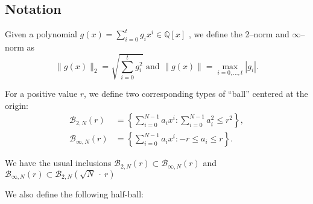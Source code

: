 \documentclass[a4paper, 12pt]{article}
\newcommand{\ndash}{\nobreakdash --}
\begin{document}
	\subsection{Notation}
	
	Given a polynomial $g(x)=\sum_{i=0}^{t}{g_i x^i} \in \mathbb{Q}[x]$ , we define the 2\ndash norm and $\infty$\ndash norm as
	\[
		\|g(x)\|_2 = \sqrt{\sum_{i=0}^{t}{g_i^2}} \text{ and } \|g(x)\|=\max_{i=0, \dots, t} |g_i|.
	\]	
	
	For a positive value $r$, we define two corresponding types of “ball” centered at	the origin:
	\begin{align*}
		\mathcal{B}_{2,N}(r)&=\left\{ \sum_{i=0}^{N-1}{a_i x^i} : \sum_{i=0}^{N-1}{a_i^2 \le r^2} \right\},\\
		\mathcal{B}_{\infty,N}(r)&=\left\{ \sum_{i=0}^{N-1}{a_i x^i} : {-r \le a_i \le r} \right\}.
	\end{align*}
	
	We have the usual inclusions $\mathcal{B}_{2,N}(r) \subset \mathcal{B}_{\infty,N}(r)$ and $\mathcal{B}_{\infty,N}(r) \subset \mathcal{B}_{2,N}(\surd N~\cdot~r)$
	
	We also define the following half-ball:
	
	
	
\end{document}
